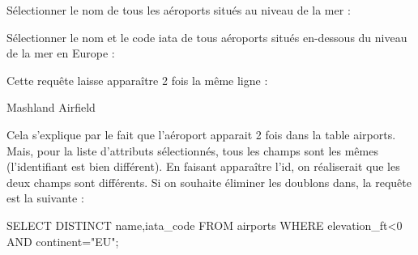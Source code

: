 \documentclass[10pt]{article}
\newif\ifprof
\begin{document}
\begin{exemple}
Sélectionner le nom de tous les aéroports situés au niveau de la mer :

\ifprof
$$
\pi_{\text{name}}\left(\sigma_{\text{elevation\_ft = 0}}(\text{airports})\right)
$$
\begin{envsql}
\begin{sql}
SELECT name FROM airports WHERE elevation_ft=0
\end{sql}
\end{envsql}
\else
\vspace{3cm}
\fi

Sélectionner le nom et le code iata de tous aéroports situés en-dessous du niveau de la mer en Europe :
\ifprof
$$
\pi_{\text{name},\text{iata\_code}}\left(\sigma_{\text{elevation\_ft} < \text{0}\wedge \text{continent}=\text{EU})}(\text{airports} )\right)
$$
\begin{envsql}
\begin{sql}
SELECT name,iata_code FROM airports WHERE elevation_ft<0 AND continent="EU";
\end{sql}
\end{envsql}
\else
\vspace{3cm}
\fi


Cette requête laisse apparaître 2 fois la même ligne : 
\begin{sql}
Mashland Airfield   
\end{sql}
Cela s'explique par le fait que l'aéroport apparait 2 fois dans la table airports. Mais, pour la liste d'attributs sélectionnés, tous les champs sont les mêmes (l'identifiant est bien différent). En faisant apparaître l'id, on réaliserait que les deux champs sont différents. 
Si on souhaite éliminer les doublons dans, la requête est la suivante : 

\begin{envsql}
\begin{sql}
SELECT DISTINCT name,iata_code FROM airports WHERE elevation_ft<0 AND continent="EU";
\end{sql}

\end{envsql}

\end{exemple}
\end{document}
